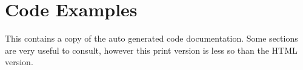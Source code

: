 \chapter{Code Examples}
This contains a copy of the auto generated code documentation. Some sections are very useful to consult, however this print version is less so than the HTML version.

